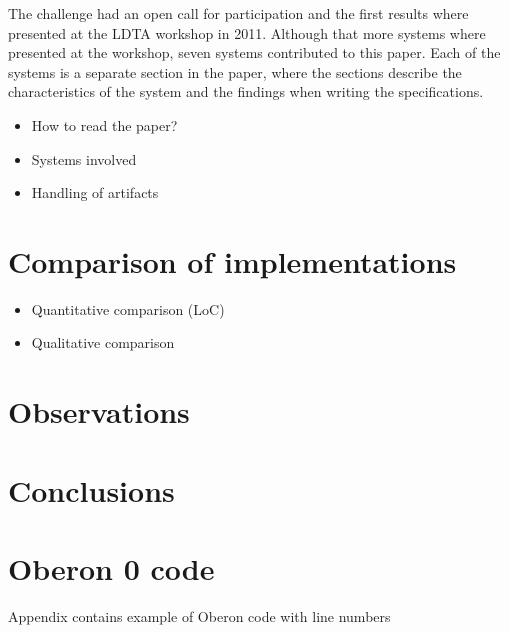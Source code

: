 \documentclass[english,preprint,12pt]{elsarticle}
\begin{document}
The challenge had an open call for participation and the first results where presented at the LDTA workshop
in 2011. 
Although that more systems where presented at the workshop, seven systems contributed to this paper.
Each of the systems is a separate section in the paper, where the sections describe the characteristics
of the system and the findings when writing the specifications.

\begin{itemize}
\item How to read the paper?
\item Systems involved
\item Handling of artifacts
\end{itemize}





\section{Comparison of implementations}
\label{sec:comparison}
\begin{itemize}
\item Quantitative comparison (LoC)
\item Qualitative comparison
\end{itemize}

\section{Observations}
\label{sec:observations}

\section{Conclusions}
\label{sec:conclusions}



\appendix

\section{Oberon 0 code}
\label{sec:samples}
Appendix contains example of Oberon code with line numbers
\end{document}
